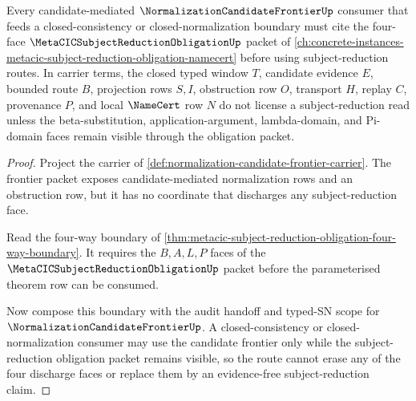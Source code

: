 \begin{theorem}
\label{thm:normalization-candidate-frontier-metacic-link}
Every candidate-mediated $\NormalizationCandidateFrontierUp$ consumer that feeds a closed-consistency or closed-normalization boundary must cite the four-face $\MetaCICSubjectReductionObligationUp$ packet of \autoref{ch:concrete-instances-metacic-subject-reduction-obligation-namecert} before using subject-reduction routes. In carrier terms, the closed typed window $T$, candidate evidence $E$, bounded route $B$, projection rows $S,I$, obstruction row $O$, transport $H$, replay $C$, provenance $P$, and local $\NameCert$ row $N$ do not license a subject-reduction read unless the beta-substitution, application-argument, lambda-domain, and Pi-domain faces remain visible through the obligation packet.
\end{theorem}
\begin{proof}
Project the carrier of \autoref{def:normalization-candidate-frontier-carrier}. The frontier packet exposes candidate-mediated normalization rows and an obstruction row, but it has no coordinate that discharges any subject-reduction face.

Read the four-way boundary of \autoref{thm:metacic-subject-reduction-obligation-four-way-boundary}. It requires the $B,A,L,P$ faces of the $\MetaCICSubjectReductionObligationUp$ packet before the parameterised theorem row can be consumed.

Now compose this boundary with the audit handoff and typed-SN scope for $\NormalizationCandidateFrontierUp$. A closed-consistency or closed-normalization consumer may use the candidate frontier only while the subject-reduction obligation packet remains visible, so the route cannot erase any of the four discharge faces or replace them by an evidence-free subject-reduction claim.
\end{proof}
